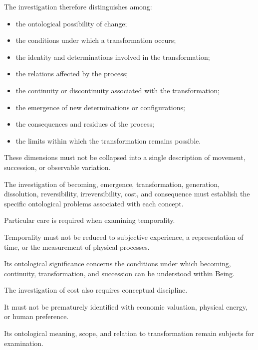The investigation therefore
distinguishes among:

\begin{itemize}

    \item the ontological possibility
    of change;

    \item the conditions under
    which a transformation occurs;

    \item the identity and determinations
    involved in the transformation;

    \item the relations affected
    by the process;

    \item the continuity or
    discontinuity associated
    with the transformation;

    \item the emergence of new
    determinations or configurations;

    \item the consequences and
    residues of the process;

    \item the limits within which
    the transformation remains
    possible.

\end{itemize}

These dimensions must not be
collapsed into a single description
of movement, succession, or
observable variation.

The investigation of becoming,
emergence, transformation,
generation, dissolution,
reversibility, irreversibility,
cost, and consequence must
establish the specific ontological
problems associated with each
concept.

Particular care is required
when examining temporality.

Temporality must not be reduced
to subjective experience,
a representation of time,
or the measurement of physical
processes.

Its ontological significance
concerns the conditions under
which becoming, continuity,
transformation, and succession
can be understood within Being.

The investigation of cost also
requires conceptual discipline.

It must not be prematurely
identified with economic valuation,
physical energy, or human
preference.

Its ontological meaning, scope,
and relation to transformation
remain subjects for examination.

